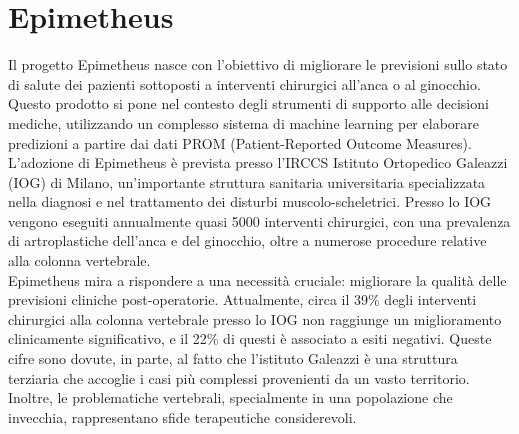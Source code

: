 \chapter{Epimetheus}
\label{cap:epimetheus}

Il progetto Epimetheus nasce con l'obiettivo di migliorare le previsioni sullo stato di salute dei pazienti sottoposti a interventi chirurgici all'anca o al ginocchio. Questo prodotto si pone nel contesto degli strumenti di supporto alle decisioni mediche, utilizzando un complesso sistema di machine learning per elaborare predizioni a partire dai dati PROM (Patient-Reported Outcome Measures).\\
L'adozione di Epimetheus è prevista presso l'IRCCS Istituto Ortopedico Galeazzi (IOG) di Milano, un'importante struttura sanitaria universitaria specializzata nella diagnosi e nel trattamento dei disturbi muscolo-scheletrici. Presso lo IOG vengono eseguiti annualmente quasi 5000 interventi chirurgici, con una prevalenza di artroplastiche dell'anca e del ginocchio, oltre a numerose procedure relative alla colonna vertebrale.\\
Epimetheus mira a rispondere a una necessità cruciale: migliorare la qualità delle previsioni cliniche post-operatorie. Attualmente, circa il 39\% degli interventi chirurgici alla colonna vertebrale presso lo IOG non raggiunge un miglioramento clinicamente significativo, e il 22\% di questi è associato a esiti negativi. Queste cifre sono dovute, in parte, al fatto che l'istituto Galeazzi è una struttura terziaria che accoglie i casi più complessi provenienti da un vasto territorio. Inoltre, le problematiche vertebrali, specialmente in una popolazione che invecchia, rappresentano sfide terapeutiche considerevoli.\\

